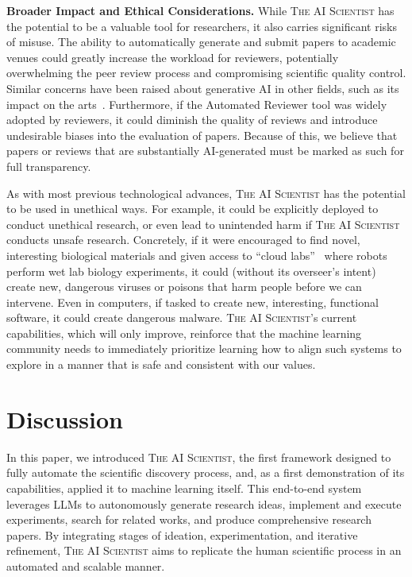 \documentclass[11pt, a4paper]{include/gdm_format}
\newcommand{\ouralgo}{\textsc{The AI Scientist}\xspace}
\begin{document}
\textbf{Broader Impact and Ethical Considerations.}
While \ouralgo has the potential to be a valuable tool for researchers, it also carries significant risks of misuse. The ability to automatically generate and submit papers to academic venues could greatly increase the workload for reviewers, potentially overwhelming the peer review process and compromising scientific quality control. Similar concerns have been raised about generative AI in other fields, such as its impact on the arts~\citep{epstein2023art}. Furthermore, if the Automated Reviewer tool was widely adopted by reviewers, it could diminish the quality of reviews and introduce undesirable biases into the evaluation of papers. Because of this, we believe that papers or reviews that are substantially AI-generated must be marked as such for full transparency.

%

As with most previous technological advances, \ouralgo has the potential to be used in unethical ways.
For example, it could be explicitly deployed to conduct unethical research, or even lead to unintended harm if \ouralgo conducts unsafe research.
Concretely, if it were encouraged to find novel, interesting biological materials and given access to ``cloud labs''~\citep{arnold2022cloud} where robots perform wet lab biology experiments, it could (without its overseer's intent) create new, dangerous viruses or poisons that harm people before we can intervene.
Even in computers, if tasked to create new, interesting, functional software, it could create dangerous malware.
\ouralgo's current capabilities, which will only improve, reinforce that the machine learning community needs to immediately prioritize learning how to align such systems to explore in a manner that is safe and consistent with our values.


\section{Discussion}
\label{sec:conclusion}

In this paper, we introduced \ouralgo, the first framework designed to fully automate the scientific discovery process, and, as a first demonstration of its capabilities, applied it to machine learning itself.
This end-to-end system leverages LLMs to autonomously generate research ideas, implement and execute experiments, search for related works, and produce comprehensive research papers.
By integrating stages of ideation, experimentation, and iterative refinement, \ouralgo aims to replicate the human scientific process in an automated and scalable manner.
\end{document}
